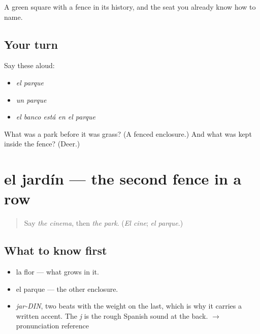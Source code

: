 \begin{grammarlens}[title={What you've built}]
A green square with a fence in its history, and the seat you already know how to name.
\end{grammarlens}

\subsection*{Your turn}
Say these aloud:

\begin{itemize}
\raggedright
  \item \emph{el parque}
  \item \emph{un parque}
  \item \emph{el banco está en el parque}
\end{itemize}

\begin{tcolorbox}[breakable,colback=teal!4,colframe=teal!35!black,title={Before you move on}]
What was a park before it was grass? (A fenced enclosure.) And what was kept inside the fence? (Deer.)
\end{tcolorbox}
\section[el jardín]{el jardín — the second fence in a row}

\label{lesson:ES-C354-jardin}



\begin{quote}
Say \emph{the cinema}, then \emph{the park}. (\emph{El cine}; \emph{el parque}.)
\end{quote}

\subsection*{What to know first}
\begin{itemize}
\raggedright
  \item la flor — what grows in it.
  \item el parque — the other enclosure.
\end{itemize}

\begin{sounds}
\begin{itemize}
\raggedright
  \item \emph{jar-DIN}, two beats with the weight on the last, which is why it carries a written accent. The \emph{j} is the rough Spanish sound at the back. $\to$ pronunciation reference
\end{itemize}
\end{sounds}

